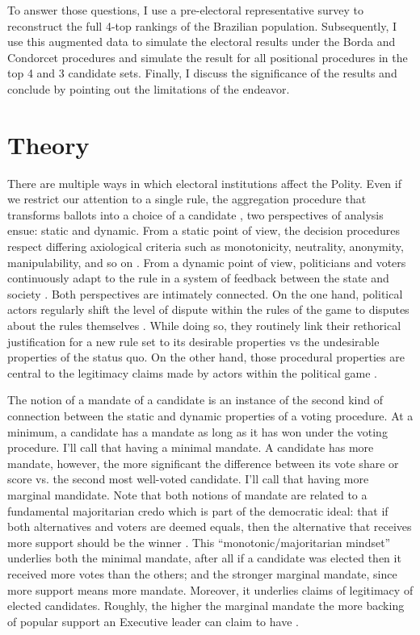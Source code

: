 \documentclass[hidelinks,11pt]{article}
\begin{document}
To answer those questions, I use a pre-electoral representative survey to
reconstruct the full 4-top rankings of the Brazilian population. Subsequently, I
use this augmented data to simulate the electoral results under the Borda and
Condorcet procedures and simulate the result for all positional procedures in
the top 4 and 3 candidate sets. Finally, I discuss the significance of the
results and conclude by pointing out the limitations of the endeavor.


\section{Theory}
There are multiple ways in which electoral institutions affect the Polity. Even
if we restrict our attention to a single rule, the aggregation procedure that
transforms ballots into a choice of a candidate \parencite{Goodin_2006}, two
perspectives of analysis ensue: static and dynamic. From a static point of view,
the decision procedures respect differing axiological criteria such as
monotonicity, neutrality, anonymity, manipulability, and so on
\parencite{nurmi1999voting}. From a dynamic point of view, politicians and
voters continuously adapt to the rule in a system of feedback between the state
and society \parencite{Wange2021systems}. Both perspectives are intimately
connected. On the one hand, political actors regularly shift the level of
dispute within the rules of the game to disputes about the rules themselves
\parencite{ostrom2009understanding}. While doing so, they routinely link their
rethorical justification for a new rule set to its desirable properties vs the
undesirable properties of the status quo. On the other hand, those procedural
properties are central to the legitimacy claims made by actors within the
political game \parencite{patty2014social}.

The notion of a mandate of a candidate is an instance of the second kind of
connection between the static and dynamic properties of a voting procedure. At a
minimum, a candidate has a mandate as long as it has won under the voting
procedure. I'll call that having a minimal mandate. A candidate has more
mandate, however, the more significant the difference between its vote share or
score vs. the second most well-voted candidate. I'll call that having more
marginal mandidate. Note that both notions of mandate are related to a
fundamental majoritarian credo which is part of the democratic ideal: that if
both alternatives and voters are deemed equals, then the alternative that
receives more support should be the winner \parencite{dahl1989democracy}. This
``monotonic/majoritarian mindset'' underlies both the minimal mandate, after all
if a candidate was elected then it received more votes than the others; and the
stronger marginal mandate, since more support means more mandate. Moreover, it
underlies claims of legitimacy of elected candidates. Roughly, the higher the
marginal mandate the more backing of popular support an Executive leader can
claim to have \parencite{grossman2022majoritarian}.
\end{document}

